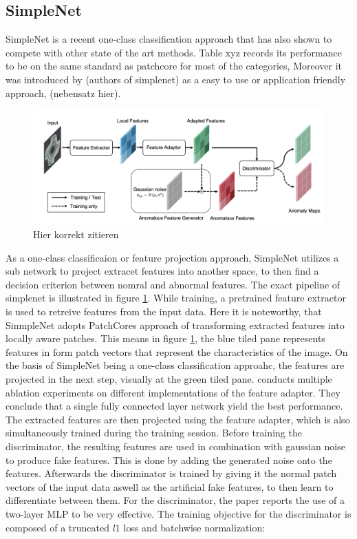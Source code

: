 \subsection{SimpleNet}
\label{subsec:simplenet}
SimpleNet \cite{liu2023simplenet} is a recent one-class classification approach that has also shown to compete with other state of the art methods. Table xyz records its performance to be on the same standard as patchcore 
for most of the categories, %
Moreover it was introduced by (authors of simplenet) as a easy to use or application friendly approach, (nebensatz hier).

\begin{figure}[ht]
    \centering
    \includegraphics[width=\textwidth]{figures/simplenet_architecture.png}
    \caption{Hier korrekt zitieren}
    \label{fig:simplenetpipeline}
\end{figure}

As a one-class classificaion or feature projection approach, SimpleNet utilizes a sub network to project extracet features into another space, to then find a decision criterion between nomral and 
abnormal features. The exact pipeline of simplenet is illustrated in figure \ref{fig:simplenetpipeline}. While training, a pretrained feature extractor is used to retreive features from the input data. Here it is noteworthy, 
that SinmpleNet adopts PatchCores approach of transforming extracted features into locally aware patches. This means in figure \ref{fig:simplenetpipeline}, the blue tiled pane represents features in form patch vectors 
that represent the characteristics of the image. On the basis of SimpleNet being a one-class classification approahc, the features are projected in the next step, visually at the green tiled pane. 
\cite{liu2023simplenet} conducts multiple ablation experiments on different implementations of the feature adapter. They conclude that a single fully connected layer network yield the best 
performance. The extracted features are then projected using the feature adapter, which is also simultaneously trained during the training session. Before training the discriminator, the resulting 
features are used in combination with gaussian noise to produce fake features. This is done by adding the generated noise onto the features. Afterwards the discriminator is trained by giving it 
the normal patch vectors of the input data aswell as the artificial fake features, to then learn to differentiate between them. For the discriminator, the paper reports the use of a two-layer 
MLP to be very effective. The training objective for the discriminator is composed of a truncated $l1$ loss and batchwise normalization:

